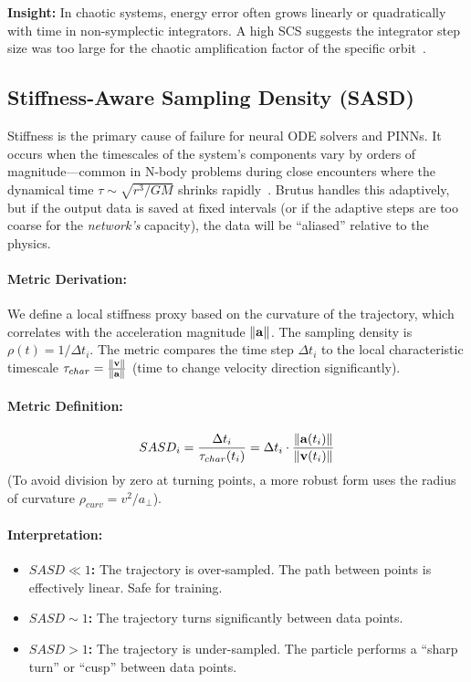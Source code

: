 \textbf{Insight:} In chaotic systems, energy error often grows linearly or quadratically with time in non-symplectic integrators. A high SCS suggests the integrator step size was too large for the chaotic amplification factor of the specific orbit~\cite{ref1}.

\subsection{Stiffness-Aware Sampling Density (SASD)}

Stiffness is the primary cause of failure for neural ODE solvers and PINNs. It occurs when the timescales of the system's components vary by orders of magnitude—common in N-body problems during close encounters where the dynamical time $\tau \sim \sqrt{r^3/GM}$ shrinks rapidly~\cite{ref23}. Brutus handles this adaptively, but if the output data is saved at fixed intervals (or if the adaptive steps are too coarse for the \textit{network's} capacity), the data will be ``aliased'' relative to the physics.

\paragraph{Metric Derivation:}
We define a local stiffness proxy based on the curvature of the trajectory, which correlates with the acceleration magnitude $\left\lVert\mathbf{a}\right\rVert$. The sampling density is $\rho(t) = 1/\Delta t_i$.
The metric compares the time step $\Delta t_i$ to the local characteristic timescale $\tau_{char} = \frac{\left\lVert\mathbf{v}\right\rVert}{\left\lVert\mathbf{a}\right\rVert}$ (time to change velocity direction significantly).

\paragraph{Metric Definition:}
\begin{equation}
    SASD_i = \frac{\Delta t_i}{\tau_{char}(t_i)} = \Delta t_i \cdot \frac{\left\lVert\mathbf{a}(t_i)\right\rVert}{\left\lVert\mathbf{v}(t_i)\right\rVert}
\end{equation}
(To avoid division by zero at turning points, a more robust form uses the radius of curvature $\rho_{curv} = v^2/a_{\perp}$).

\paragraph{Interpretation:}
\begin{itemize}
    \item \textbf{$SASD \ll 1$:} The trajectory is over-sampled. The path between points is effectively linear. Safe for training.
    \item \textbf{$SASD \sim 1$:} The trajectory turns significantly between data points.
    \item \textbf{$SASD > 1$:} The trajectory is under-sampled. The particle performs a ``sharp turn'' or ``cusp'' between data points.
\end{itemize}

